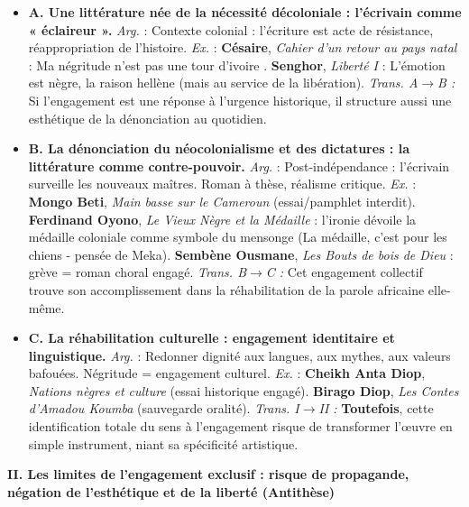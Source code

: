 \documentclass[11pt]{article}
\begin{document}
\begin{exoresolu}
\begin{itemize}
    \item \textbf{A. Une littérature née de la nécessité décoloniale : l'écrivain comme « éclaireur ».}
    \textit{Arg.} : Contexte colonial : l'écriture est acte de résistance, réappropriation de l'histoire.
    \textit{Ex.} : \textbf{Césaire}, \emph{Cahier d'un retour au pays natal} : \og Ma négritude n'est pas une tour d'ivoire \fg. \textbf{Senghor}, \emph{Liberté I} : \og L'émotion est nègre, la raison hellène \fg (mais au service de la libération).
    \textit{Trans. A$\to$B :} \og Si l'engagement est une réponse à l'urgence historique, il structure aussi une esthétique de la dénonciation au quotidien. \fg
    \item \textbf{B. La dénonciation du néocolonialisme et des dictatures : la littérature comme contre-pouvoir.}
    \textit{Arg.} : Post-indépendance : l'écrivain surveille les nouveaux maîtres. Roman à thèse, réalisme critique.
    \textit{Ex.} : \textbf{Mongo Beti}, \emph{Main basse sur le Cameroun} (essai/pamphlet interdit). \textbf{Ferdinand Oyono}, \emph{Le Vieux Nègre et la Médaille} : l'ironie dévoile la médaille coloniale comme symbole du mensonge (\og La médaille, c'est pour les chiens \fg - pensée de Meka). \textbf{Sembène Ousmane}, \emph{Les Bouts de bois de Dieu} : grève = roman choral engagé.
    \textit{Trans. B$\to$C :} \og Cet engagement collectif trouve son accomplissement dans la réhabilitation de la parole africaine elle-même. \fg
    \item \textbf{C. La réhabilitation culturelle : engagement identitaire et linguistique.}
    \textit{Arg.} : Redonner dignité aux langues, aux mythes, aux valeurs bafouées. Négritude = engagement culturel.
    \textit{Ex.} : \textbf{Cheikh Anta Diop}, \emph{Nations nègres et culture} (essai historique engagé). \textbf{Birago Diop}, \emph{Les Contes d'Amadou Koumba} (sauvegarde oralité).
    \textit{Trans. I$\to$II :} \og \textbf{Toutefois}, cette identification totale du sens à l'engagement risque de transformer l'œuvre en simple instrument, niant sa spécificité artistique. \fg
\end{itemize}

\textbf{II. Les limites de l'engagement exclusif : risque de propagande, négation de l'esthétique et de la liberté (Antithèse)}


\end{exoresolu}
\end{document}
